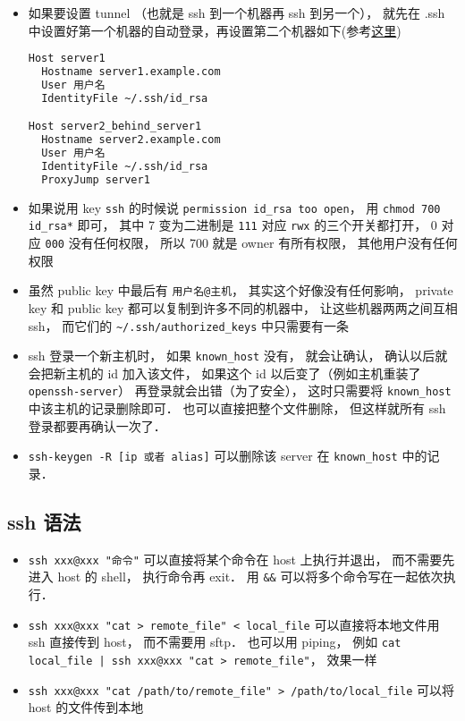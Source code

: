 \begin{itemize}
\item 如果要设置 tunnel （也就是 ssh 到一个机器再 ssh 到另一个）， 就先在 .ssh 中设置好第一个机器的自动登录，再设置第二个机器如下(参考\href{https://askubuntu.com/questions/311447/how-do-i-ssh-to-machine-a-via-b-in-one-command}{这里})
\begin{lstlisting}[language=bash]
Host server1
  Hostname server1.example.com
  User 用户名
  IdentityFile ~/.ssh/id_rsa

Host server2_behind_server1
  Hostname server2.example.com
  User 用户名
  IdentityFile ~/.ssh/id_rsa
  ProxyJump server1
\end{lstlisting}

\item 如果说用 key \verb`ssh` 的时候说 \verb`permission id_rsa too open`， 用 \verb`chmod 700 id_rsa*` 即可， 其中 7 变为二进制是 \verb`111` 对应 \verb`rwx` 的三个开关都打开， 0 对应 \verb`000` 没有任何权限， 所以 700 就是 owner 有所有权限， 其他用户没有任何权限
\item 虽然 public key 中最后有 \verb`用户名@主机`， 其实这个好像没有任何影响， private key 和 public key 都可以复制到许多不同的机器中， 让这些机器两两之间互相 ssh， 而它们的 \verb`~/.ssh/authorized_keys` 中只需要有一条
\item ssh 登录一个新主机时， 如果 \verb`known_host` 没有， 就会让确认， 确认以后就会把新主机的 id 加入该文件， 如果这个 id 以后变了（例如主机重装了 \verb`openssh-server`） 再登录就会出错（为了安全）， 这时只需要将 \verb`known_host` 中该主机的记录删除即可． 也可以直接把整个文件删除， 但这样就所有 ssh 登录都要再确认一次了．
\item \verb|ssh-keygen -R [ip 或者 alias]| 可以删除该 server 在 \verb|known_host| 中的记录．
\end{itemize}

\subsection{ssh 语法}
\begin{itemize}
\item \verb`ssh xxx@xxx "命令"` 可以直接将某个命令在 host 上执行并退出， 而不需要先进入 host 的 shell， 执行命令再 exit． 用 \verb`&&` 可以将多个命令写在一起依次执行．
\item \verb`ssh xxx@xxx "cat > remote_file" < local_file` 可以直接将本地文件用 ssh 直接传到 host， 而不需要用 sftp． 也可以用 piping， 例如 \verb`cat local_file | ssh xxx@xxx "cat > remote_file"`， 效果一样
\item \verb`ssh xxx@xxx "cat /path/to/remote_file" > /path/to/local_file` 可以将 host 的文件传到本地
\end{itemize}

